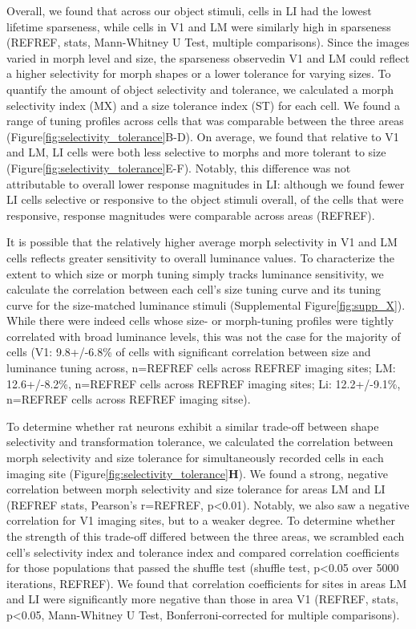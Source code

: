 Overall, we found that across our object stimuli, cells in LI had the lowest lifetime sparseness, while cells in V1 and LM were similarly high in sparseness (REFREF, stats, Mann-Whitney U Test, multiple comparisons). Since the images varied in morph level and size, the sparseness observedin V1 and LM could reflect a higher selectivity for morph shapes or a lower tolerance for varying sizes. To quantify the amount of object selectivity and tolerance, we calculated a morph selectivity index (MX) and a size tolerance index (ST) for each cell\cite{Zoccolan2007}. We found a range of tuning profiles across cells that was comparable between the three areas (Figure\ref{fig:selectivity_tolerance}B-D). On average, we found that relative to V1 and LM, LI cells were both less selective to morphs and more tolerant to size (Figure\ref{fig:selectivity_tolerance}E-F). Notably, this difference was not attributable to overall lower response magnitudes in LI: although we found fewer LI cells selective or responsive to the object stimuli overall, of the cells that were responsive, response magnitudes were comparable across areas (REFREF). 

It is possible that the relatively higher average morph selectivity in V1 and LM cells reflects greater sensitivity to overall luminance values. To characterize the extent to which size or morph tuning simply tracks luminance sensitivity, we calculate the correlation between each cell's size tuning curve and its tuning curve for the size-matched luminance stimuli (Supplemental Figure\ref{fig:supp_X}). While there were indeed cells whose size- or morph-tuning profiles were tightly correlated with broad luminance levels, this was not the case for the majority of cells (V1: 9.8+/-6.8\% of cells with significant correlation between size and luminance tuning across, n=REFREF cells across REFREF imaging sites; LM: 12.6+/-8.2\%, n=REFREF cells across REFREF imaging sites; Li: 12.2+/-9.1\%, n=REFREF cells across REFREF imaging sitse). 

To determine whether rat neurons exhibit a similar trade-off between shape selectivity and transformation tolerance, we calculated the correlation between morph selectivity and size tolerance for simultaneously recorded cells in each imaging site (Figure\ref{fig:selectivity_tolerance}\textbf{H}). We found a strong, negative correlation between morph selectivity and size tolerance for areas LM and LI (REFREF stats, Pearson’s r=REFREF, p<0.01). Notably, we also saw a negative correlation for V1 imaging sites, but to a weaker degree. To determine whether the strength of this trade-off differed between the three areas, we scrambled each cell’s selectivity index and tolerance index and compared correlation coefficients for those populations that passed the shuffle test (shuffle test, p<0.05 over 5000 iterations, REFREF). We found that correlation coefficients for sites in areas LM and LI were significantly more negative than those in area V1 (REFREF, stats, p<0.05, Mann-Whitney U Test, Bonferroni-corrected for multiple comparisons). 

